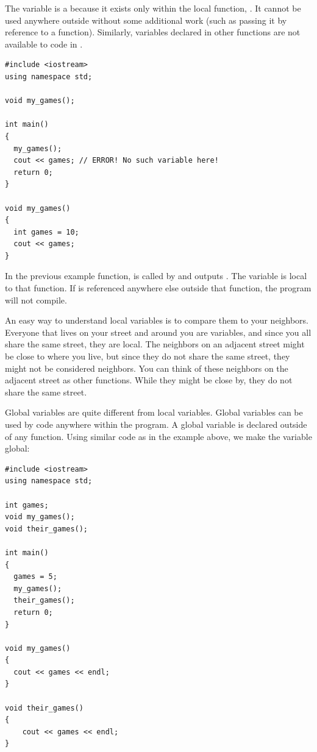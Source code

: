 The variable  is a  because it exists only within the local function, . 
It cannot be used anywhere outside  without some additional work (such as passing it by reference to a function). 
Similarly, variables declared in other functions are not available to code in .

\noindent\begin{minipage}{\linewidth}\begin{lstlisting}
#include <iostream>
using namespace std;
	
void my_games();

int main()
{
  my_games();
  cout << games; // ERROR! No such variable here!
  return 0;
}

void my_games()
{
  int games = 10;
  cout << games;
}
\end{lstlisting}\end{minipage}

In the previous example function,  is called by  and outputs .
The variable  is local to that function. 
If  is referenced anywhere else outside that function, the program will not compile.

An easy way to understand local variables is to compare them to your neighbors. 
Everyone that lives on your street and around you are variables, and since you all share the same street, they are local. 
The neighbors on an adjacent street might be close to where you live, but since they do not share the same street, they might not be considered neighbors. 
You can think of these neighbors on the adjacent street as other functions. 
While they might be close by, they do not share the same street.

Global variables are quite different from local variables. 
Global variables can be used by code anywhere within the program. 
A global variable is declared outside of any function. 
Using similar code as in the example above, we make the  variable global: \nopagebreak[4]

\noindent\begin{minipage}{\linewidth}\begin{lstlisting}
#include <iostream>
using namespace std;

int games;
void my_games();
void their_games();

int main()
{
  games = 5;
  my_games();
  their_games();
  return 0;
}

void my_games()
{
  cout << games << endl;
}

void their_games()
{
	cout << games << endl;
}
\end{lstlisting}\end{minipage}

